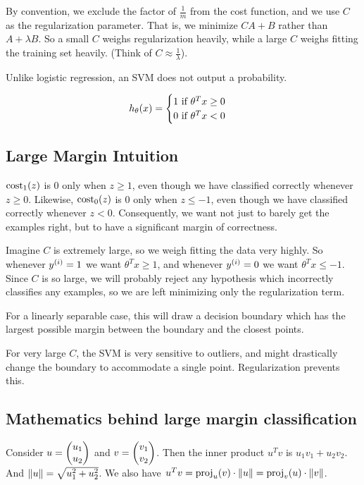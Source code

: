 By convention, we exclude the factor of $\frac{1}{m}$ from the cost function,
and we use $C$ as the regularization parameter.
That is, we minimize $CA + B$ rather than $A + \lambda B$.
So a small $C$ weighs regularization heavily,
while a large $C$ weighs fitting the training set heavily.
(Think of $C \approx \frac{1}{\lambda}$).

Unlike logistic regression, an SVM does not output a probability.

\[
    h_\theta(x) = \begin{cases}
        1 \text{ if } \theta^T x \geq 0 \\
        0 \text{ if } \theta^T x < 0
    \end{cases}
\]

\subsection{Large Margin Intuition}

$\operatorname{cost}_1(z)$ is 0 only when $z \geq 1$,
even though we have classified correctly whenever $z \geq 0$.
Likewise, $\operatorname{cost}_0(z)$ is 0 only when $z \leq -1$,
even though we have classified correctly whenever $z < 0$.
Consequently, we want not just to barely get the examples right,
but to have a significant margin of correctness.

Imagine $C$ is extremely large, so we weigh fitting the data very highly.
So whenever $y_{}^{(i)} = 1$ we want $\theta^T x \geq 1$,
and whenever $y_{}^{(i)} = 0$ we want $\theta^T x \leq -1$.
Since $C$ is so large, we will probably reject any hypothesis which
incorrectly classifies any examples,
so we are left minimizing only the regularization term.

For a linearly separable case, this will draw a decision boundary which
has the largest possible margin between the boundary and the closest points.

For very large $C$, the SVM is very sensitive to outliers,
and might drastically change the boundary to accommodate a single point.
Regularization prevents this.

\subsection{Mathematics behind large margin classification}

Consider $u = \mqty(u_1 \\ u_2)$ and $v = \mqty(v_1 \\ v_2)$.
Then the inner product $u^T v$ is $u_1 v_1 + u_2 v_2$.
And $\left\lVert u \right\rVert = \sqrt{u_1^2 + u_2^2}$.
We also have $u^T v = \mathrm{proj}_u(v) \cdot \left\lVert u \right\rVert = \mathrm{proj}_v(u) \cdot \left\lVert v \right\rVert$.

